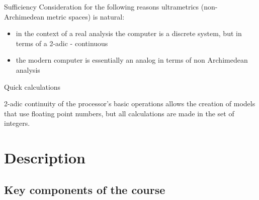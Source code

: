 \begin{frame}{Sufficiency}
 Consideration for the following reasons ultrametrics (non-Archimedean metric spaces) is natural:
  \begin{itemize}
  \pause
  \item
in the context of a real analysis  the computer is a discrete system, but in terms of a 2-adic - continuous
     
  \pause
  \item
the modern computer is essentially an analog in terms of non Archimedean analysis
    
  \end{itemize}


\end{frame}

\begin{frame}{Quick calculations}

 2-adic continuity of the processor's basic operations  allows the creation of models that use floating point numbers, but all calculations are made   in the set of integers.



\end{frame}






\section{Description}

\subsection{Key components of the course}

